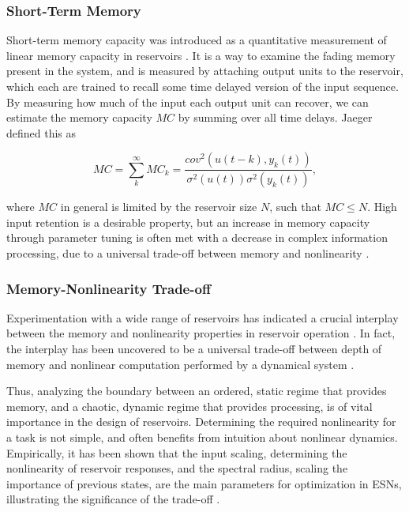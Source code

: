 \subsubsection{Short-Term Memory}

Short-term memory capacity was introduced as a quantitative measurement of
linear memory capacity in reservoirs \cite{jaeger_short_2002}. It is a way to
examine the fading memory present in the system, and is measured by attaching
output units to the reservoir, which each are trained to recall some time
delayed version of the input sequence. By measuring how much of the input each
output unit can recover, we can estimate the memory capacity $MC$ by summing
over all time delays. Jaeger defined this as

\begin{equation}
  MC =
  \sum_{k}^{\infty}MC_{k} =
  \frac
  {cov^2(u(t-k), y_k(t))}
  {\sigma^{2}(u(t))\sigma^{2}(y_{k}(t))}
  ,
  \label{stm-eq}
\end{equation}

where $MC$ in general is limited by the reservoir size $N$, such that $MC \leq
N$. High input retention is a desirable property, but an increase in memory
capacity through parameter tuning is often met with a decrease in complex
information processing, due to a universal trade-off between memory and
nonlinearity \cite{dambre_information_2012}.

\subsubsection{Memory-Nonlinearity Trade-off}

Experimentation with a wide range of reservoirs has indicated a crucial
interplay between the memory and nonlinearity properties in reservoir operation
\cite{verstraeten_memory_2010}. In fact, the interplay has been uncovered to be
a universal trade-off between depth of memory and nonlinear computation
performed by a dynamical system \cite{dambre_information_2012}.

Thus, analyzing the boundary between an ordered, static regime that provides
memory, and a chaotic, dynamic regime that provides processing, is of vital
importance in the design of reservoirs. Determining the required nonlinearity
for a task is not simple, and often benefits from intuition about nonlinear
dynamics. Empirically, it has been shown that the input scaling, determining the
nonlinearity of reservoir responses, and the spectral radius, scaling the
importance of previous states, are the main parameters for optimization in ESNs,
illustrating the significance of the trade-off \cite{montavon_practical_2012}.

